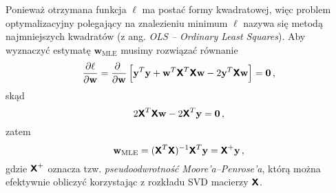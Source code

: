 \documentclass{myclass}
\begin{document}
Ponieważ otrzymana funkcja \(\ell\) ma postać formy kwadratowej, więc problem optymalizacyjny
polegający na znalezieniu minimum \(\ell\) nazywa się metodą najmniejszych kwadratów (z ang.
\textit{OLS -- Ordinary Least Squares}). Aby wyznaczyć estymatę \(\mathbf{w}_\text{MLE}\) musimy
rozwiązać równanie
\begin{equation*}
    \pdv{\ell}{\mathbf{w}} = \pdv{~}{\mathbf{w}}\left[\mathbf{y}^T\mathbf{y} + \mathbf{w}^T\boldsymbol{\mathsf{X}}^T\boldsymbol{\mathsf{X}}\mathbf{w} - 2\mathbf{y}^T\boldsymbol{\mathsf{X}}\mathbf{w}\right] = \mathbf{0}\,,
\end{equation*}
skąd
\begin{equation*}
    2\boldsymbol{\mathsf{X}}^T\boldsymbol{\mathsf{X}}\mathbf{w} - 2\boldsymbol{\mathsf{X}}^T\mathbf{y} = \mathbf{0}\,,
\end{equation*}
zatem
\begin{equation*}
    \mathbf{w}_\text{MLE} = (\boldsymbol{\mathsf{X}}^T\boldsymbol{\mathsf{X}})^{-1}\boldsymbol{\mathsf{X}}^T\mathbf{y} = \boldsymbol{\mathsf{X}}^+\mathbf{y}\,,
\end{equation*}
gdzie \(\boldsymbol{\mathsf{X}}^+\) oznacza tzw. \textit{pseudoodwrotność Moore'a--Penrose'a}, którą można
efektywnie obliczyć korzystając z rozkładu SVD macierzy \(\boldsymbol{\mathsf{X}}\).
\end{document}
